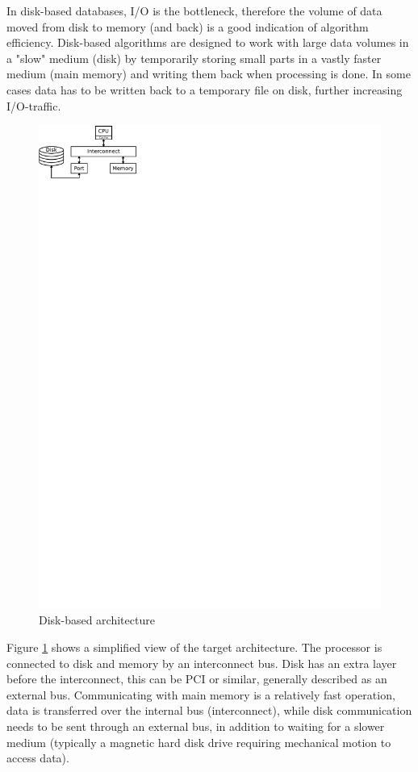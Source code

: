 In disk-based databases, I/O is the bottleneck, therefore the volume
of data moved from disk to memory (and back) is a good indication of
algorithm efficiency. Disk-based algorithms are designed to work with
large data volumes in a "slow" medium (disk) by temporarily storing
small parts in a vastly faster medium (main memory) and writing them
back when processing is done. In some cases data has to be written
back to a temporary file on disk, further increasing I/O-traffic.

\begin{figure}[H]
	\centering
	\includegraphics[scale=1.5,trim=0 26.45cm 15.05cm 0.1cm]{img/disk-based-architecture}
	\caption{Disk-based architecture}
	\label{fig:disk-based-arch}
\end{figure}

Figure \ref{fig:disk-based-arch} shows a simplified view of the target
architecture. The processor is connected to disk and memory by an
interconnect bus. Disk has an extra layer before the interconnect,
this can be PCI or similar, generally described as an external bus.
Communicating with main memory is a relatively fast operation, data is
transferred over the internal bus (interconnect), while disk
communication needs to be sent through an external bus, in addition to
waiting for a slower medium (typically a magnetic hard disk drive
requiring mechanical motion to access data).

